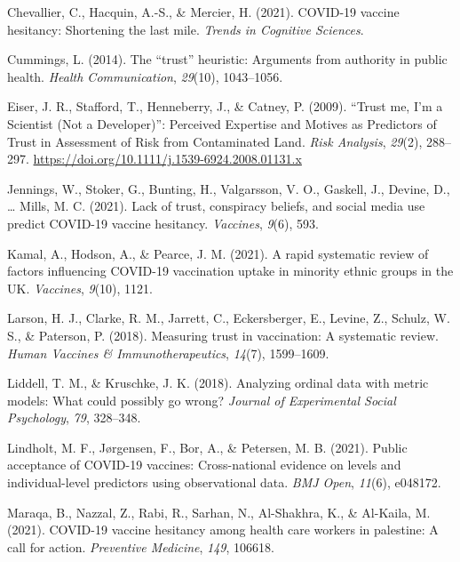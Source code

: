 \documentclass[
  english,
  ,jou,floatsintext]{apa6}
\newlength{\cslhangindent}
\newlength{\cslentryspacingunit} %
\newenvironment{CSLReferences}[2] %
 {%
  \setlength{\parindent}{0pt}
  \ifodd #1
  \let\oldpar\par
  \def\par{\hangindent=\cslhangindent\oldpar}
  \fi
  \setlength{\parskip}{#2\cslentryspacingunit}
 }%
 {}
\begin{document}
\begin{CSLReferences}{1}{0}
\leavevmode{}%
Chevallier, C., Hacquin, A.-S., \& Mercier, H. (2021). COVID-19 vaccine hesitancy: Shortening the last mile. \emph{Trends in Cognitive Sciences}.

\leavevmode{}%
Cummings, L. (2014). The {``trust''} heuristic: Arguments from authority in public health. \emph{Health Communication}, \emph{29}(10), 1043--1056.

\leavevmode{}%
Eiser, J. R., Stafford, T., Henneberry, J., \& Catney, P. (2009). {``{Trust} me, {I}'m a {Scientist} ({Not} a {Developer})''}: {Perceived} {Expertise} and {Motives} as {Predictors} of {Trust} in {Assessment} of {Risk} from {Contaminated} {Land}. \emph{Risk Analysis}, \emph{29}(2), 288--297. \url{https://doi.org/10.1111/j.1539-6924.2008.01131.x}

\leavevmode{}%
Jennings, W., Stoker, G., Bunting, H., Valgarsson, V. O., Gaskell, J., Devine, D., \ldots{} Mills, M. C. (2021). Lack of trust, conspiracy beliefs, and social media use predict COVID-19 vaccine hesitancy. \emph{Vaccines}, \emph{9}(6), 593.

\leavevmode{}%
Kamal, A., Hodson, A., \& Pearce, J. M. (2021). A rapid systematic review of factors influencing COVID-19 vaccination uptake in minority ethnic groups in the UK. \emph{Vaccines}, \emph{9}(10), 1121.

\leavevmode{}%
Larson, H. J., Clarke, R. M., Jarrett, C., Eckersberger, E., Levine, Z., Schulz, W. S., \& Paterson, P. (2018). Measuring trust in vaccination: A systematic review. \emph{Human Vaccines \& Immunotherapeutics}, \emph{14}(7), 1599--1609.

\leavevmode{}%
Liddell, T. M., \& Kruschke, J. K. (2018). Analyzing ordinal data with metric models: What could possibly go wrong? \emph{Journal of Experimental Social Psychology}, \emph{79}, 328--348.

\leavevmode{}%
Lindholt, M. F., Jørgensen, F., Bor, A., \& Petersen, M. B. (2021). Public acceptance of COVID-19 vaccines: Cross-national evidence on levels and individual-level predictors using observational data. \emph{BMJ Open}, \emph{11}(6), e048172.

\leavevmode{}%
Maraqa, B., Nazzal, Z., Rabi, R., Sarhan, N., Al-Shakhra, K., \& Al-Kaila, M. (2021). COVID-19 vaccine hesitancy among health care workers in palestine: A call for action. \emph{Preventive Medicine}, \emph{149}, 106618.


\end{CSLReferences}
\end{document}
